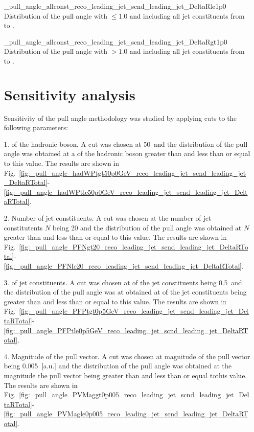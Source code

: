           {_pull_angle_allconst_reco_leading_jet_scnd_leading_jet_DeltaRle1p0}
          {Distribution of the pull angle with \DeltaR$\leq1.0$ and including all jet constituents from \leadingjet to \scndleadingjet.}

          {_pull_angle_allconst_reco_leading_jet_scnd_leading_jet_DeltaRgt1p0}
          {Distribution of the pull angle with \DeltaR$>1.0$ and including all jet constituents from \leadingjet to \scndleadingjet.}

\section{Sensitivity analysis}

Sensitivity of the pull angle methodology was studied by applying cuts to the following parameters:

1. \pt of the hadronic \PW boson. A cut was chosen at 50~\GeV and the distribution of the pull angle was obtained at a \pt of the hadronic \PW boson greater than and less than or equal to this value. The results are shown in Fig.~\ref{fig:_pull_angle_hadWPtgt50p0GeV_reco_leading_jet_scnd_leading_jet_DeltaRTotal}-\ref{fig:_pull_angle_hadWPtle50p0GeV_reco_leading_jet_scnd_leading_jet_DeltaRTotal}.

2. Number of jet constituents. A cut was chosen at the number of jet constitutents $N$ being 20 and the distribution of the pull angle was obtained at $N$ greater than and less than or equal to this value. The results are shown in Fig.~\ref{fig:_pull_angle_PFNgt20_reco_leading_jet_scnd_leading_jet_DeltaRTotal}-\ref{fig:_pull_angle_PFNle20_reco_leading_jet_scnd_leading_jet_DeltaRTotal}.
                                        
3. \pt of jet constituents. A cut was chosen at \pt of the jet constituents being 0.5~\GeV and the distribution of the pull angle was at obtained at \pt of the jet constituents being greater than and less than or equal to this value. The results are shown in Fig.~\ref{fig:_pull_angle_PFPtgt0p5GeV_reco_leading_jet_scnd_leading_jet_DeltaRTotal}-\ref{fig:_pull_angle_PFPtle0p5GeV_reco_leading_jet_scnd_leading_jet_DeltaRTotal}.

4. Magnitude of the pull vector. A cut was chosen at magnitude of the pull vector being 0.005~[a.u.] and the distribution of the pull angle was obtained at the magnitude the pull vector being greater than and less than or equal tothis value. The results are shown in Fig.~\ref{fig:_pull_angle_PVMaggt0p005_reco_leading_jet_scnd_leading_jet_DeltaRTotal}-\ref{fig:_pull_angle_PVMagle0p005_reco_leading_jet_scnd_leading_jet_DeltaRTotal}.

